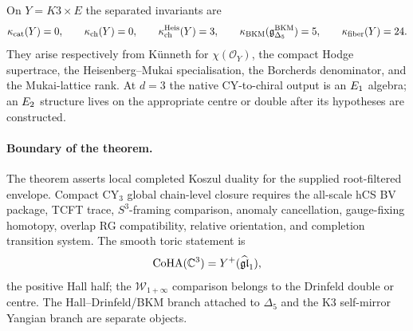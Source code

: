 On $Y=K3\times E$ the separated invariants are
\[
  \kappa_{\mathrm{cat}}(Y)=0,\qquad
  \kappa_{\mathrm{ch}}(Y)=0,\qquad
  \kappa_{\mathrm{ch}}^{\mathrm{Heis}}(Y)=3,\qquad
  \kappa_{\mathrm{BKM}}(\mathfrak{g}^{\mathrm{BKM}}_{\Delta_5})=5,\qquad
  \kappa_{\mathrm{fiber}}(Y)=24.
\]
They arise respectively from K\"unneth for $\chi(\mathcal O_Y)$, the
compact Hodge supertrace, the Heisenberg--Mukai specialisation, the
Borcherds denominator, and the Mukai-lattice rank.  At $d=3$ the
native CY-to-chiral output is an $E_1$ algebra; an $E_2$ structure
lives on the appropriate centre or double after its hypotheses are
constructed.

\paragraph{Boundary of the theorem.}
The theorem asserts local completed Koszul duality for the supplied
root-filtered envelope.  Compact CY$_3$ global chain-level closure
requires the all-scale hCS BV package, TCFT trace, $S^3$-framing
comparison, anomaly cancellation, gauge-fixing homotopy, overlap RG
compatibility, relative orientation, and completion transition system.
The smooth toric statement is
\[
  \mathrm{CoHA}(\mathbb{C}^3)=Y^+(\widehat{\mathfrak{gl}}_1),
\]
the positive Hall half; the $\mathcal W_{1+\infty}$ comparison belongs
to the Drinfeld double or centre.  The Hall--Drinfeld/BKM branch
attached to $\Delta_5$ and the K3 self-mirror Yangian branch are
separate objects.

